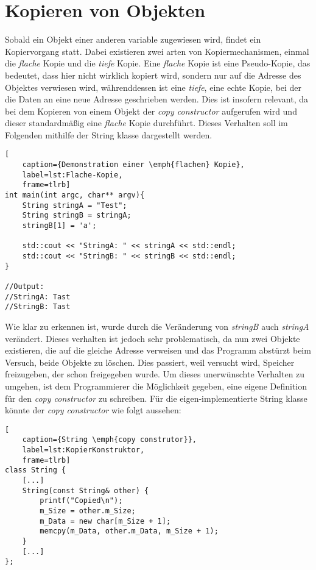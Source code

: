 \section{Kopieren von Objekten}\label{sec:kopieren}
Sobald ein Objekt einer anderen variable zugewiesen wird, findet ein Kopiervorgang statt. Dabei
existieren zwei arten von Kopiermechanismen, einmal die \emph{flache} Kopie und die \emph{tiefe}
Kopie. Eine \emph{flache} Kopie ist eine Pseudo-Kopie, das bedeutet, dass hier nicht wirklich
kopiert wird, sondern nur auf die Adresse des Objektes verwiesen wird, währenddessen ist eine
\emph{tiefe}, eine echte Kopie, bei der die Daten an eine neue Adresse geschrieben werden. Dies
ist insofern relevant, da bei dem Kopieren von einem Objekt der \emph{copy constructor}
aufgerufen wird und dieser standardmäßig eine \emph{flache} Kopie durchführt. Dieses Verhalten
soll im Folgenden mithilfe der String klasse dargestellt werden.

\begin{lstlisting}[
    caption={Demonstration einer \emph{flachen} Kopie},
    label=lst:Flache-Kopie,
    frame=tlrb]
int main(int argc, char** argv){
	String stringA = "Test";
	String stringB = stringA;
	stringB[1] = 'a';

	std::cout << "StringA: " << stringA << std::endl;
	std::cout << "StringB: " << stringB << std::endl;
}

//Output:
//StringA: Tast
//StringB: Tast
\end{lstlisting}

Wie klar zu erkennen ist, wurde durch die Veränderung von \emph{stringB} auch \emph{stringA}
verändert. Dieses verhalten ist jedoch sehr problematisch, da nun zwei Objekte existieren, die
auf die gleiche Adresse verweisen und das Programm abstürzt beim Versuch, beide Objekte zu löschen.
Dies passiert, weil versucht wird, Speicher freizugeben, der schon freigegeben wurde.
Um dieses unerwünschte Verhalten zu umgehen, ist dem Programmierer die Möglichkeit gegeben, eine
eigene Definition für den \emph{copy constructor} zu schreiben. Für die eigen-implementierte String
klasse könnte der \emph{copy constructor} wie folgt aussehen:

\begin{lstlisting}[
    caption={String \emph{copy construtor}},
    label=lst:KopierKonstruktor,
    frame=tlrb]
class String {
	[...]
    String(const String& other) {
        printf("Copied\n");
        m_Size = other.m_Size;
        m_Data = new char[m_Size + 1];
        memcpy(m_Data, other.m_Data, m_Size + 1);
    }
	[...]
};
\end{lstlisting}

